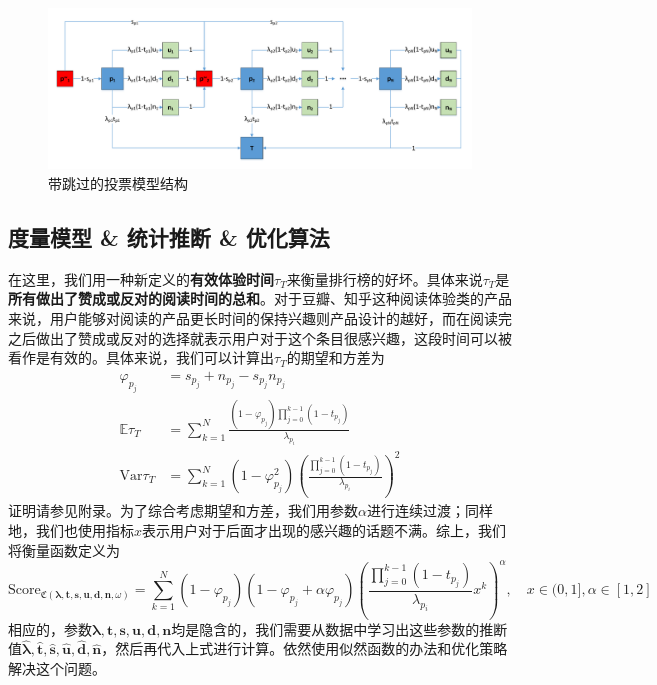 \documentclass[UTF8]{ctexart}
\theoremstyle{plain}
\theoremstyle{definition}
\theoremstyle{remark}
\begin{document}
	\begin{figure}[h!]
		\centering
		\includegraphics[width = 12cm]{modelC_fig_2.pdf}
		\caption{带跳过的投票模型结构}\label{modelC_fig_2}
	\end{figure}
	
	\subsection{度量模型 \& 统计推断 \& 优化算法}
	在这里，我们用一种新定义的\textbf{有效体验时间}$\tau_T$来衡量排行榜的好坏。具体来说$\tau_T$是\textbf{所有做出了赞成或反对的阅读时间的总和}。对于豆瓣、知乎这种阅读体验类的产品来说，用户能够对阅读的产品更长时间的保持兴趣则产品设计的越好，而在阅读完之后做出了赞成或反对的选择就表示用户对于这个条目很感兴趣，这段时间可以被看作是有效的。具体来说，我们可以计算出$\tau_T$的期望和方差为
	\begin{equation} \label{EQ_C}
	\begin{aligned}
	\varphi_{p_j} & = s_{p_j} + n_{p_j} - s_{p_j}n_{p_j} \\
	\mathbb{E} \tau_T & = \sum_{k=1}^N \frac{(1-\varphi_{p_j})\prod\limits_{j=0}^{k-1}(1-t_{p_j})}{\lambda_{p_i}} \\
	\mathrm{Var} \tau_T & = \sum_{k=1}^N (1-\varphi_{p_j}^2)\left(\frac{\prod\limits_{j=0}^{k-1}(1-t_{p_j})}{\lambda_{p_i}}\right)^2
	\end{aligned}
	\end{equation}
	证明请参见附录。为了综合考虑期望和方差，我们用参数$\alpha$进行连续过渡；同样地，我们也使用指标$x$表示用户对于后面才出现的感兴趣的话题不满。综上，我们将衡量函数定义为
	\begin{equation}
	\mathrm{Score}_{\mathfrak{C}\left(\bm{\lambda}, \bm{t}, \bm{s}, \bm{u}, \bm{d}, \bm{n},\omega\right)} = \sum_{k=1}^N (1-\varphi_{p_j})(1-\varphi_{p_j}+\alpha \varphi_{p_j})\left(\frac{\prod\limits_{j=0}^{k-1}(1-t_{p_j})}{\lambda_{p_i}} x^k\right)^\alpha, \quad x \in (0, 1], \alpha \in [1, 2]
	\end{equation}
	相应的，参数$\bm{\lambda}, \bm{t}, \bm{s}, \bm{u}, \bm{d}, \bm{n}$均是隐含的，我们需要从数据中学习出这些参数的推断值$\bm{\hat{\lambda}}, \bm{\hat{t}}, \bm{\hat{s}}, \bm{\hat{u}}, \bm{\hat{d}}, \bm{\hat{n}}$，然后再代入上式进行计算。依然使用似然函数的办法和优化策略解决这个问题。 \\
	
\end{document}
